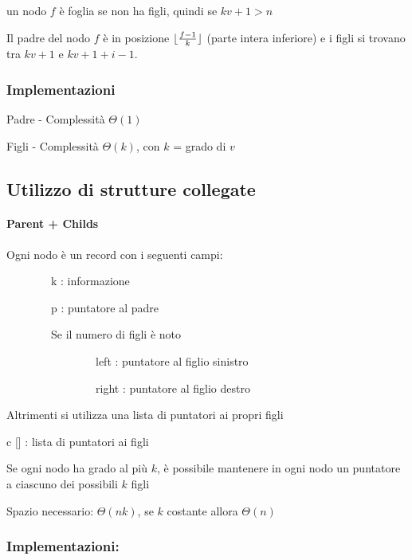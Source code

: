 \documentclass{article}
\DeclarePairedDelimiter\floor{\lfloor}{\rfloor}
\let\oldparagraph\paragraph
\renewcommand{\paragraph}[1]{\oldparagraph{#1}\mbox{}}
\begin{document}
{{{{un nodo $f$ è foglia se non ha figli, quindi se $kv+1>n$}

{Il padre del nodo $f$ è in posizione $\floor{\frac{f-1}{k}}$ (parte intera inferiore) e i figli si trovano tra $kv+1$ e $kv+1+i-1$.

\subsubsection{Implementazioni}

{Padre - Complessità $\Theta(1)$}



{Figli - Complessità $\Theta(k)$, con $k$ = grado di $v$}



\subsection{Utilizzo di strutture collegate}

\paragraph{Parent + Childs}

{}

{Ogni nodo è un record con i seguenti campi:}

{~~~~~~~~k : informazione}

{~~~~~~~~p : puntatore al padre}



{~~~~~~~~Se il numero di figli è noto}

{}

{~~~~~~~~~~~~~~~~left : puntatore al figlio sinistro}

{~~~~~~~~~~~~~~~~right : puntatore al figlio destro}

{}

{Altrimenti si utilizza una lista di puntatori ai propri figli}

{c {[}{]} : lista di puntatori ai figli~~~~~~~~}

{Se ogni nodo ha grado al più $k$, è possibile mantenere in ogni nodo un puntatore a ciascuno dei possibili $k$ figli}

{Spazio necessario: $\Theta(nk)$, se $k$ costante allora $\Theta(n)$}

\subsubsection{Implementazioni:}

}}}}
\end{document}
